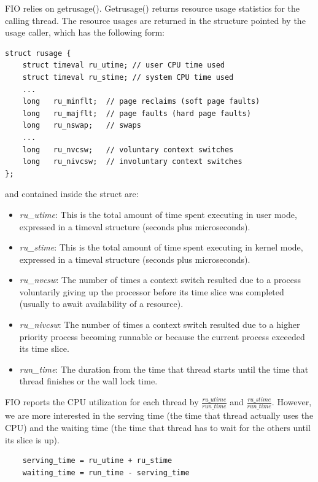 \documentclass{acmsig}
\begin{document}
FIO relies on getrusage(). Getrusage() returns resource usage statistics for the calling thread. The resource usages are returned in the structure pointed by the usage caller, which has the following form:

\begin{lstlisting}
struct rusage {
    struct timeval ru_utime; // user CPU time used
    struct timeval ru_stime; // system CPU time used
    ...
    long   ru_minflt;  // page reclaims (soft page faults)
    long   ru_majflt;  // page faults (hard page faults)
    long   ru_nswap;   // swaps
    ...
    long   ru_nvcsw;   // voluntary context switches
    long   ru_nivcsw;  // involuntary context switches
};
\end{lstlisting}

and contained inside the struct are:

\begin{itemize}
  \item \textit{ru\_utime}: This is the total amount of time spent executing in user mode, expressed in a timeval structure (seconds plus microseconds).
  \item \textit{ru\_stime}: This is the total amount of time spent executing in kernel mode, expressed in a timeval structure (seconds plus microseconds).
  \item \textit{ru\_nvcsw}: The number of times a context switch resulted due to a process voluntarily giving up the processor before its time slice was completed (usually to await availability of a resource).
  \item \textit{ru\_nivcsw}: The number of times a context switch resulted due to a higher priority process becoming runnable or because the current process exceeded its time slice.
  \item \textit{run\_time}: The duration from the time that thread starts until the time that thread finishes or the wall lock time.
\end{itemize}

FIO reports the CPU utilization for each thread by $\frac{ru\_utime}{run\_time}$ and $\frac{ru\_stime}{run\_time}$. However, we are more interested in the serving time (the time that thread actually uses the CPU) and the waiting time (the time that thread has to wait for the others until its slice is up).
\begin{lstlisting}
    serving_time = ru_utime + ru_stime
    waiting_time = run_time - serving_time
\end{lstlisting}
\end{document}
